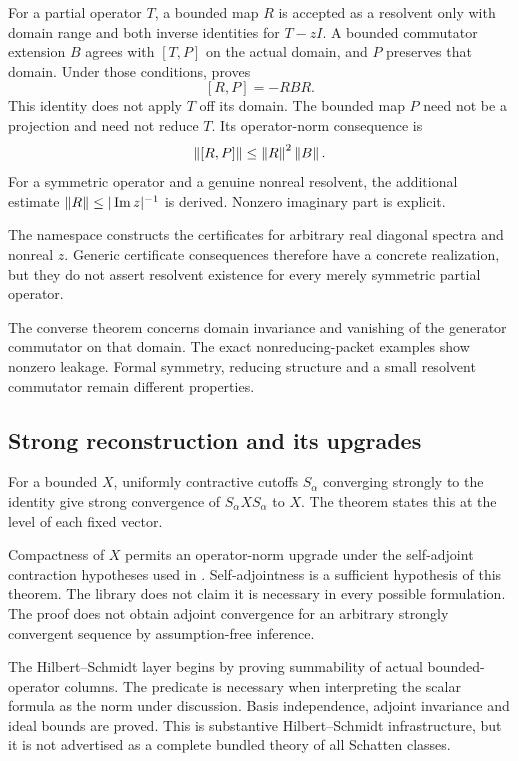 For a partial operator \(T\), a bounded map \(R\) is accepted as a resolvent only with domain range and both inverse identities for \(T-zI\). A bounded commutator extension \(B\) agrees with \([T,P]\) on the actual domain, and \(P\) preserves that domain. Under those conditions,  proves
\[
 [R,P]=-RBR.
\]
This identity does not apply \(T\) off its domain. The bounded map \(P\) need not be a projection and need not reduce \(T\). Its operator-norm consequence is
\[
 \left\lVert[R,P]\right\rVert\le \left\lVert R\right\rVert^2\left\lVert B\right\rVert.
\]
For a symmetric operator and a genuine nonreal resolvent, the additional estimate \(\left\lVert R\right\rVert\le|\operatorname{Im}z|^{-1}\) is derived. Nonzero imaginary part is explicit.

The namespace  constructs the certificates for arbitrary real diagonal spectra and nonreal \(z\). Generic certificate consequences therefore have a concrete realization, but they do not assert resolvent existence for every merely symmetric partial operator.

The converse theorem  concerns domain invariance and vanishing of the generator commutator on that domain. The exact nonreducing-packet examples show nonzero leakage. Formal symmetry, reducing structure and a small resolvent commutator remain different properties.

\subsection{Strong reconstruction and its upgrades}

For a bounded \(X\), uniformly contractive cutoffs \(S_\alpha\) converging strongly to the identity give strong convergence of \(S_\alpha X S_\alpha\) to \(X\). The theorem  states this at the level of each fixed vector.

Compactness of \(X\) permits an operator-norm upgrade under the self-adjoint contraction hypotheses used in . Self-adjointness is a sufficient hypothesis of this theorem. The library does not claim it is necessary in every possible formulation. The proof does not obtain adjoint convergence for an arbitrary strongly convergent sequence by assumption-free inference.

The Hilbert--Schmidt layer begins by proving summability of actual bounded-operator columns. The predicate  is necessary when interpreting the scalar formula  as the norm under discussion. Basis independence, adjoint invariance and ideal bounds are proved. This is substantive Hilbert--Schmidt infrastructure, but it is not advertised as a complete bundled theory of all Schatten classes.

